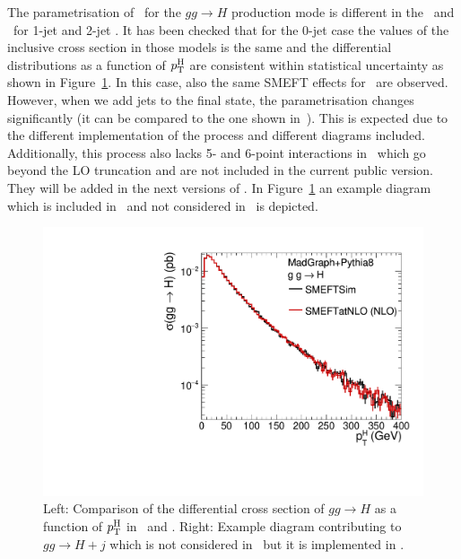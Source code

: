         
The parametrisation of \cpG\ for the $gg\to H$ production mode is different in the \SMEFTsim\ and \SMEFTatNLO\ for 1-jet and 2-jet . It has been checked that for the 0-jet case the values of the inclusive cross section in those models is the same and the differential distributions as a function of $p_{\textrm T}^{ \textrm H}$ are consistent within statistical uncertainty as shown in Figure~\ref{fig:higgseft:ggHcomp}. In this case, also the same SMEFT effects for \cpG\ are observed.
However, when we add jets to the final state, the parametrisation changes significantly (it can be compared to the one shown in~\cite{ATL-PHYS-PUB-2019-042}). This is expected due to the different implementation of the process and different diagrams included. Additionally, this process also lacks 5- and 6-point interactions in \SMEFTsim\ which go beyond the LO truncation and are not included in the current public version. They will be added in the next versions of \SMEFTsim. In Figure~\ref{fig:higgseft:ggHcomp} an example diagram which is included in \SMEFTatNLO\ and not considered in \SMEFTsim\ is depicted.

\begin{figure}
  
  \includegraphics[width=0.49\linewidth]{figures/pT_Higgs.pdf}
    \caption{ Left: Comparison of the differential cross section of  $gg\to H$ as a function of $p_{\textrm T}^{ \textrm H}$ in \SMEFTsim\ and \SMEFTatNLO. Right: Example diagram contributing to $gg\to H +j$ which is not considered in \SMEFTsim\ but it is implemented in \SMEFTatNLO.}
    \label{fig:higgseft:ggHcomp}
\end{figure}

